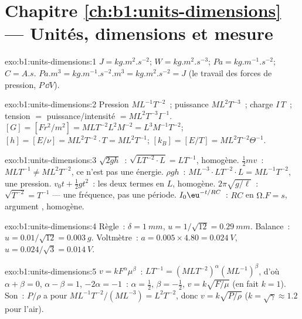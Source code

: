 \section*{Chapitre \ref{ch:b1:units-dimensions} --- Unités, dimensions et mesure}

\begin{solution}{exo:b1:units-dimensions:1}
$\unit{J} = \unit{kg.m^2.s^{-2}}$; $\unit{W} = \unit{kg.m^2.s^{-3}}$;
$\unit{Pa} = \unit{kg.m^{-1}.s^{-2}}$; $\unit{C} = \unit{A.s}$.
$\unit{Pa.m^3} = \unit{kg.m^{-1}.s^{-2}.m^3} = \unit{kg.m^2.s^{-2}} = \unit{J}$
(le travail des forces de pression, $P\,\dd V$).
\end{solution}

\begin{solution}{exo:b1:units-dimensions:2}
Pression $M L^{-1} T^{-2}$~; puissance $M L^2 T^{-3}$~; charge $I\,T$~;
tension $= $ puissance/intensité $= M L^2 T^{-3} I^{-1}$.
$[G] = [F r^2/m^2] = M L T^{-2} L^2 M^{-2} = L^3 M^{-1} T^{-2}$;
$[h] = [E/\nu] = M L^2 T^{-2} \cdot T = M L^2 T^{-1}$;
$[k_B] = [E/T] = M L^2 T^{-2} \Theta^{-1}$.
\end{solution}

\begin{solution}{exo:b1:units-dimensions:3}
$\sqrt{2gh}$~: $\sqrt{L T^{-2} \cdot L} = L T^{-1}$, homogène.
$\tfrac12 mv$~: $M L T^{-1} \neq M L^2 T^{-2}$, ce n'est pas une énergie.
$\rho g h$~: $M L^{-3} \cdot L T^{-2} \cdot L = M L^{-1} T^{-2}$, une pression.
$v_0 t + \tfrac12 g t^2$~: les deux termes en $L$, homogène.
$2\pi\sqrt{g/\ell}$~: $\sqrt{T^{-2}} = T^{-1}$ --- une fréquence, pas une période.
$I_0\eu^{-t/RC}$~: $RC$ en $\unit{\ohm.F} = \unit{s}$, argument , homogène.
\end{solution}

\begin{solution}{exo:b1:units-dimensions:4}
Règle~: $\delta = \qty{1}{mm}$, $u = 1/\sqrt{12} = \qty{0.29}{mm}$.
Balance~: $u = 0.01/\sqrt{12} = \qty{0.003}{g}$.
Voltmètre~: $a = 0.005 \times 4.80 = \qty{0.024}{V}$,
$u = 0.024/\sqrt3 = \qty{0.014}{V}$.
\end{solution}

\begin{solution}{exo:b1:units-dimensions:5}
$v = k F^\alpha \mu^\beta$~: $L T^{-1} = (M L T^{-2})^\alpha (M L^{-1})^\beta$,
d'où $\alpha + \beta = 0$, $\alpha - \beta = 1$, $-2\alpha = -1$~:
$\alpha = \tfrac12$, $\beta = -\tfrac12$, $v = k\sqrt{F/\mu}$ (en fait $k = 1$).
Son~: $P/\rho$ a pour  $M L^{-1} T^{-2} / (M L^{-3}) = L^2 T^{-2}$,
donc $v = k\sqrt{P/\rho}$ ($k = \sqrt\gamma \approx 1.2$ pour l'air).
\end{solution}

